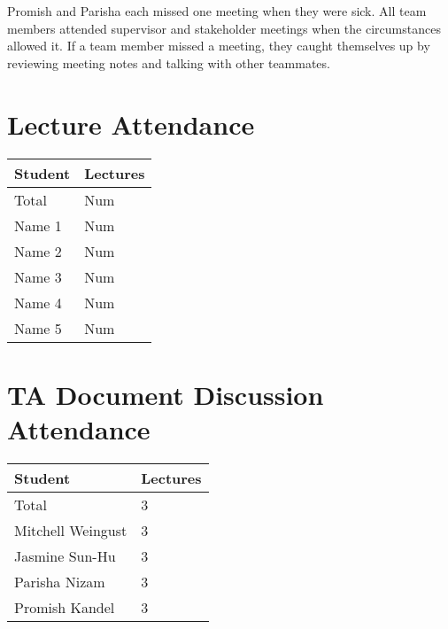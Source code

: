\documentclass{article}
\begin{document}
Promish and Parisha each missed one meeting when they were sick. All team members attended supervisor and stakeholder meetings when the circumstances allowed it.
If a team member missed a meeting, they caught themselves up by reviewing meeting notes and talking with other teammates.

\section{Lecture Attendance}


\begin{table}[H]
\centering
\begin{tabular}{ll}
\toprule
\textbf{Student} & \textbf{Lectures}\\
\midrule
Total & Num\\
Name 1 & Num\\
Name 2 & Num\\
Name 3 & Num\\
Name 4 & Num\\
Name 5 & Num\\
\bottomrule
\end{tabular}
\end{table}


\section{TA Document Discussion Attendance}

\begin{table}[H]
\centering
\begin{tabular}{ll}
\toprule
\textbf{Student} & \textbf{Lectures}\\
\midrule
Total & 3\\
Mitchell Weingust & 3\\
Jasmine Sun-Hu & 3\\
Parisha Nizam & 3\\
Promish Kandel & 3\\
\bottomrule
\end{tabular}
\end{table}
\end{document}
